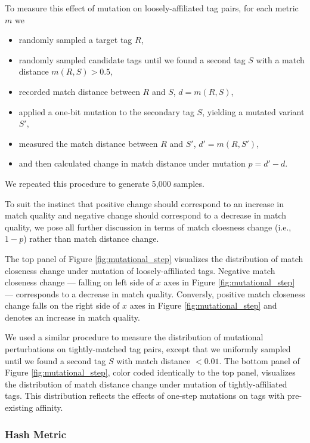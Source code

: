 To measure this effect of mutation on loosely-affiliated tag pairs, for each metric $m$ we
\begin{itemize}
    \item randomly sampled a target tag $R$,
    \item randomly sampled candidate tags until we found a second tag $S$ with a match distance $m(R, S) > 0.5$,
    \item recorded match distance between $R$ and $S$, $d = m(R, S)$,
    \item applied a one-bit mutation to the secondary tag $S$, yielding a mutated variant $S'$,
    \item measured the match distance between $R$ and $S'$, $d' = m(R, S')$,
    \item and then calculated change in match distance under mutation $p = d' - d$.
\end{itemize}
We repeated this procedure to generate 5,000 samples.

To suit the instinct that positive change should correspond to an increase in match quality and negative change should correspond to a decrease in match quality, we pose all further discussion in terms of match cloesness change (i.e., $1 - p$) rather than match distance change.

The top panel of Figure \ref{fig:mutational_step} visualizes the distribution of match closeness change under mutation of loosely-affiliated tags.
Negative match closeness change --- falling on left side of $x$ axes in Figure \ref{fig:mutational_step} --- corresponds to a decrease in match quality.
Conversly, positive match closeness change falls on the right side of $x$ axes in Figure \ref{fig:mutational_step} and denotes an increase in match quality.

We used a similar procedure to measure the distribution of mutational perturbations on tightly-matched tag pairs, except that we uniformly sampled until we found a second tag $S$ with match distance $< 0.01$.
The bottom panel of Figure \ref{fig:mutational_step}, color coded identically to the top panel, visualizes the distribution of match distance change under mutation of tightly-affiliated tags.
This distribution reflects the effects of one-step mutations on tags with pre-existing affinity.

\subsubsection{Hash Metric}

